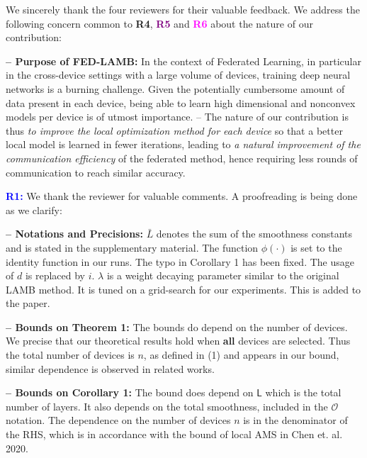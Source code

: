 \documentclass{article}
\begin{document}
We sincerely thank the four reviewers for their valuable feedback. We address the following concern common to \textbf{\textcolor{green!50!black}{R4}}, \textbf{\textcolor{purple}{R5}} and \textbf{\textcolor{magenta}{R6}} about the nature of our contribution:\vspace{-4pt}

\textbf{-- Purpose of FED-LAMB:} 
In the context of Federated Learning, in particular in the cross-device settings with a large volume of devices, training deep neural networks is a burning challenge.
Given the potentially cumbersome amount of data present in each device, being able to learn high dimensional and nonconvex models per device is of utmost importance.
-- The nature of our contribution is thus \emph{to improve the local optimization method for each device} so that a better local model is learned in fewer iterations, leading to \emph{a natural improvement of the communication efficiency} of the federated method, hence requiring less rounds of communication to reach similar accuracy.
\vspace{-2pt}

\textbf{\textcolor{blue}{R1:}} We thank the reviewer for valuable comments. A proofreading is being done as we clarify:\vspace{-4pt}


\textbf{-- Notations and Precisions:} 
$\bar{L}$ denotes the sum of the smoothness constants and is stated in the supplementary material. The function $\phi(\cdot)$ is set to the identity function in our runs. The typo in Corollary 1 has been fixed.
The usage of $d$ is replaced by $i$.
$\lambda$ is a weight decaying parameter similar to the original LAMB method. It is tuned on a grid-search for our experiments. This is added to the paper.

\vspace{-2pt}
\textbf{-- Bounds on Theorem 1:} The bounds do depend on the number of devices.
We precise that our theoretical results hold when \textbf{all} devices are selected. Thus the total number of devices is $n$, as defined in (1) and appears in our bound, similar dependence is observed in related works.
 
 \vspace{-2pt}
\textbf{-- Bounds on Corollary 1:} 
The bound does depend on $\mathsf{L}$ which is the total number of layers. 
It also depends on the total smoothness, included in the $\mathcal{O}$ notation.
The dependence on the number of devices $n$ is in the denominator of the RHS, which is in accordance with the bound of local AMS in Chen et. al. 2020.
\end{document}
